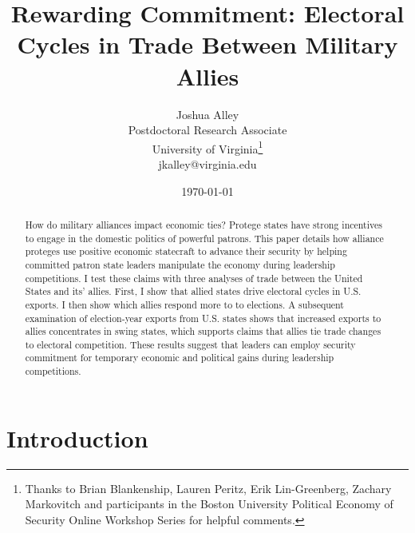 \documentclass[12pt]{article}
\title{\textbf{Rewarding Commitment: Electoral Cycles in Trade Between Military Allies}}
\author{Joshua Alley \\
Postdoctoral Research Associate \\
University of Virginia\thanks{Thanks to Brian Blankenship, Lauren Peritz, Erik Lin-Greenberg, Zachary Markovitch and participants in the Boston University Political Economy of Security Online Workshop Series for helpful comments.} \\
jkalley@virginia.edu
}
\date{\today}
\begin{document}
\maketitle 

\begin{abstract}
How do military alliances impact economic ties?
Protege states have strong incentives to engage in the domestic politics of powerful patrons. 
This paper details how alliance proteges use positive economic statecraft to advance their security by helping committed patron state leaders manipulate the economy during leadership competitions.  
I test these claims with three analyses of trade between the United States and its' allies. 
First, I show that allied states drive electoral cycles in U.S. exports. 
I then show which allies respond more to to elections. 
A subsequent examination of election-year exports from U.S. states shows that increased exports to allies concentrates in swing states, which supports claims that allies tie trade changes to electoral competition.
These results suggest that leaders can employ security commitment for temporary economic and political gains during leadership competitions. 
\end{abstract} 


\newpage 
\doublespace 


\section{Introduction}

\end{document}
